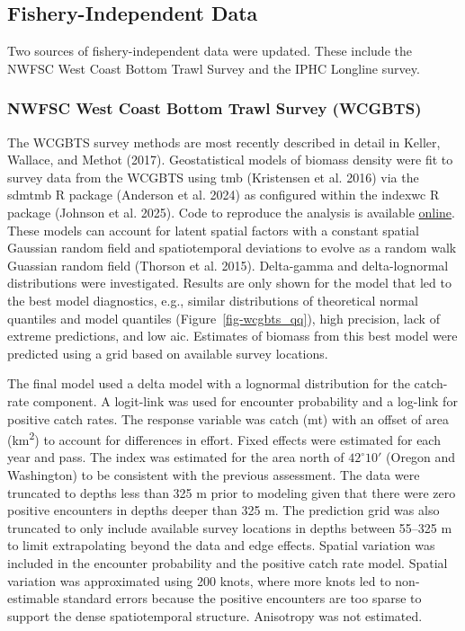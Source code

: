 \documentclass[
]{scrartcl}
\begin{document}
\subsection{Fishery-Independent Data}\label{fishery-independent-data}

Two sources of fishery-independent data were updated. These include the
NWFSC West Coast Bottom Trawl Survey and the IPHC Longline survey.

\subsubsection{NWFSC West Coast Bottom Trawl Survey
(WCGBTS)}\label{nwfsc-west-coast-bottom-trawl-survey-wcgbts}

The WCGBTS survey methods are most recently described in detail in
Keller, Wallace, and Methot (2017). Geostatistical models of biomass
density were fit to survey data from the WCGBTS using \gls{tmb}
(Kristensen et al. 2016) via the \gls{sdmtmb} R package (Anderson et al.
2024) as configured within the \gls{indexwc} R package (Johnson et al.
2025). Code to reproduce the analysis is available
\href{https://github.com/pfmc-assessments/indexwc}{online}. These models
can account for latent spatial factors with a constant spatial Gaussian
random field and spatiotemporal deviations to evolve as a random walk
Guassian random field (Thorson et al. 2015). Delta-gamma and
delta-lognormal distributions were investigated. Results are only shown
for the model that led to the best model diagnostics, e.g., similar
distributions of theoretical normal quantiles and model quantiles
(Figure~\ref{fig-wcgbts_qq}), high precision, lack of extreme
predictions, and low \gls{aic}. Estimates of biomass from this best
model were predicted using a grid based on available survey locations.

The final model used a delta model with a lognormal distribution for the
catch-rate component. A logit-link was used for encounter probability
and a log-link for positive catch rates. The response variable was catch
(mt) with an offset of area (km\textsuperscript{2}) to account for
differences in effort. Fixed effects were estimated for each year and
pass. The index was estimated for the area north of \(42^{\circ}10'\)
(Oregon and Washington) to be consistent with the previous assessment.
The data were truncated to depths less than 325 m prior to modeling
given that there were zero positive encounters in depths deeper than 325
m. The prediction grid was also truncated to only include available
survey locations in depths between 55--325 m to limit extrapolating
beyond the data and edge effects. Spatial variation was included in the
encounter probability and the positive catch rate model. Spatial
variation was approximated using 200 knots, where more knots led to
non-estimable standard errors because the positive encounters are too
sparse to support the dense spatiotemporal structure. Anisotropy was not
estimated.
\end{document}
